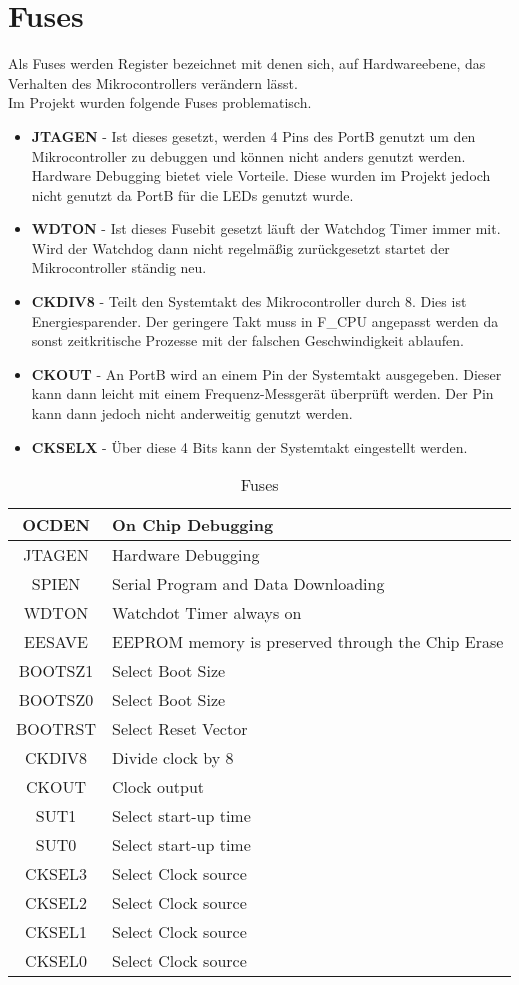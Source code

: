 \section{Fuses}
\label{sec:Fuses}
Als Fuses werden Register bezeichnet mit denen sich, auf Hardwareebene, das Verhalten des Mikrocontrollers verändern lässt. \\
Im Projekt wurden folgende Fuses problematisch.
\begin{itemize}
\item \textbf{JTAGEN} - Ist dieses  gesetzt, werden 4 Pins des PortB genutzt um den Mikrocontroller zu debuggen und können nicht anders genutzt werden. Hardware Debugging bietet viele Vorteile. Diese wurden im Projekt jedoch nicht genutzt da PortB für die LEDs genutzt wurde.
\item \textbf{WDTON} - Ist dieses Fusebit gesetzt läuft der Watchdog Timer immer mit. Wird der Watchdog dann nicht regelmäßig zurückgesetzt startet der Mikrocontroller ständig neu.
\item \textbf{CKDIV8} - Teilt den Systemtakt des Mikrocontroller durch 8. Dies ist Energiesparender. Der geringere Takt muss in F\_CPU angepasst werden da sonst zeitkritische Prozesse mit der falschen Geschwindigkeit ablaufen.
\item \textbf{CKOUT} - An PortB wird an einem Pin der Systemtakt ausgegeben. Dieser kann dann leicht mit einem Frequenz-Messgerät überprüft werden. Der Pin kann dann jedoch nicht anderweitig genutzt werden.
\item \textbf{CKSELX} - Über diese 4 Bits kann der Systemtakt eingestellt werden.
\end{itemize}
\begin{longtable}{|c|l|} 
\caption{Fuses} \\
\hline
\label{tab:Fuses}
OCDEN & On Chip Debugging \\ \hline 
JTAGEN & Hardware Debugging \\ \hline 
SPIEN & Serial Program and Data Downloading \\ \hline 
WDTON & Watchdot Timer always on \\ \hline 
EESAVE & EEPROM memory is preserved through the Chip Erase \\ \hline 
BOOTSZ1 & Select Boot Size \\ \hline 
BOOTSZ0 & Select Boot Size \\ \hline 
BOOTRST & Select Reset Vector \\ \hline 
CKDIV8 & Divide clock by 8 \\ \hline 
CKOUT & Clock output \\ \hline 
SUT1 & Select start-up time \\ \hline 
SUT0 & Select start-up time \\ \hline 
CKSEL3 & Select Clock source \\ \hline 
CKSEL2 & Select Clock source \\ \hline 
CKSEL1 & Select Clock source \\ \hline 
CKSEL0 & Select Clock source \\ \hline 
\end{longtable} 



